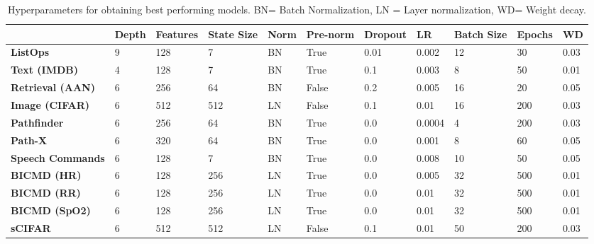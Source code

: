 \documentclass{MITcsail}
\begin{document}
\begin{table}[H]
    \centering
    \caption{Hyperparameters for obtaining best performing models. BN= Batch Normalization, LN = Layer normalization, WD= Weight decay.}
    \begin{adjustbox}{width=1\columnwidth}
    \begin{tabular}{lllllllllll}
        \toprule
               & \textbf{Depth} & \textbf{Features}   & \textbf{State Size} & \textbf{Norm} & \textbf{Pre-norm} & \textbf{Dropout} & \textbf{LR} & \textbf{Batch Size} & \textbf{Epochs} & \textbf{WD} \\
        \midrule
        \textbf{ListOps} & 9 & 128 & 7 & BN & True & 0.01 & 0.002 & 12 & 30 & 0.03 \\
        \textbf{Text (IMDB)} & 4 & 128 & 7 & BN & True & 0.1 & 0.003 & 8 & 50 & 0.01 \\
        \textbf{Retrieval (AAN)} & 6 & 256 & 64 & BN & False & 0.2 & 0.005 & 16 & 20 & 0.05\\
        \textbf{Image (CIFAR)} & 6 & 512 & 512 & LN & False & 0.1 & 0.01 & 16 & 200 & 0.03 \\
        \textbf{Pathfinder} & 6 & 256 & 64 & BN & True & 0.0 & 0.0004 & 4 & 200 & 0.03 \\
        \textbf{Path-X} & 6 & 320 & 64 & BN & True & 0.0 & 0.001 & 8 & 60 & 0.05 \\
        \midrule
        \textbf{Speech Commands} & 6 & 128 & 7 & BN & True & 0.0  & 0.008 & 10 & 50 & 0.05\\
        \midrule
        \textbf{BICMD (HR)} & 6 & 128 & 256 & LN & True & 0.0 & 0.005 & 32 & 500 & 0.01\\
        \textbf{BICMD (RR)} & 6 & 128 & 256 & LN & True & 0.0 & 0.01 & 32 & 500 & 0.01 \\
        \textbf{BICMD (SpO2)} & 6 & 128 & 256 & LN & True & 0.0 & 0.01 & 32 & 500 & 0.01 \\
        \midrule
        \textbf{sCIFAR} & 6 & 512 & 512 & LN & False & 0.1 & 0.01 & 50 & 200 & 0.03 \\
        \bottomrule
    \end{tabular}
    \end{adjustbox}
    \label{tab:hyperparams}
\end{table}
\end{document}
